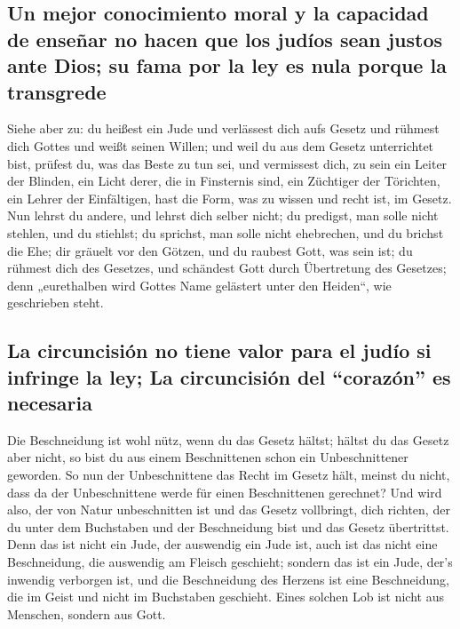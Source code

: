 \hypertarget{un-mejor-conocimiento-moral-y-la-capacidad-de-enseuxf1ar-no-hacen-que-los-juduxedos-sean-justos-ante-dios-su-fama-por-la-ley-es-nula-porque-la-transgrede}{%
\subsection{Un mejor conocimiento moral y la capacidad de enseñar no
hacen que los judíos sean justos ante Dios; su fama por la ley es nula
porque la
transgrede}\label{un-mejor-conocimiento-moral-y-la-capacidad-de-enseuxf1ar-no-hacen-que-los-juduxedos-sean-justos-ante-dios-su-fama-por-la-ley-es-nula-porque-la-transgrede}}

 Siehe aber zu: du heißest ein Jude und verlässest dich
aufs Gesetz und rühmest dich Gottes  und weißt seinen
Willen; und weil du aus dem Gesetz unterrichtet bist, prüfest du, was
das Beste zu tun sei,  und vermissest dich, zu sein ein
Leiter der Blinden, ein Licht derer, die in Finsternis sind,
 ein Züchtiger der Törichten, ein Lehrer der Einfältigen,
hast die Form, was zu wissen und recht ist, im Gesetz. 
Nun lehrst du andere, und lehrst dich selber nicht; du predigst, man
solle nicht stehlen, und du stiehlst;  du sprichst, man
solle nicht ehebrechen, und du brichst die Ehe; dir gräuelt vor den
Götzen, und du raubest Gott, was sein ist;  du rühmest
dich des Gesetzes, und schändest Gott durch Übertretung des Gesetzes;
 denn „eurethalben wird Gottes Name gelästert unter den
Heiden``, wie geschrieben steht.

\hypertarget{la-circuncisiuxf3n-no-tiene-valor-para-el-juduxedo-si-infringe-la-ley-la-circuncisiuxf3n-del-corazuxf3n-es-necesaria}{%
\subsection{La circuncisión no tiene valor para el judío si infringe la
ley; La circuncisión del ``corazón'' es
necesaria}\label{la-circuncisiuxf3n-no-tiene-valor-para-el-juduxedo-si-infringe-la-ley-la-circuncisiuxf3n-del-corazuxf3n-es-necesaria}}

 Die Beschneidung ist wohl nütz, wenn du das Gesetz
hältst; hältst du das Gesetz aber nicht, so bist du aus einem
Beschnittenen schon ein Unbeschnittener geworden.  So nun
der Unbeschnittene das Recht im Gesetz hält, meinst du nicht, dass da
der Unbeschnittene werde für einen Beschnittenen gerechnet?
 Und wird also, der von Natur unbeschnitten ist und das
Gesetz vollbringt, dich richten, der du unter dem Buchstaben und der
Beschneidung bist und das Gesetz übertrittst.  Denn das
ist nicht ein Jude, der auswendig ein Jude ist, auch ist das nicht eine
Beschneidung, die auswendig am Fleisch geschieht; 
sondern das ist ein Jude, der's inwendig verborgen ist, und die
Beschneidung des Herzens ist eine Beschneidung, die im Geist und nicht
im Buchstaben geschieht. Eines solchen Lob ist nicht aus Menschen,
sondern aus Gott.

